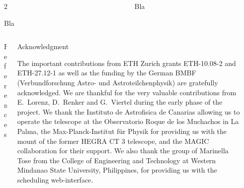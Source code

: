 \documentclass[t]{beamer}
\newlength{\thirdtextwidth}
\begin{document}
\begin{columns}[t, onlytextwidth]
  \begin{column}{2\thirdtextwidth}
    \begin{block}[equal height group=4]{Bla}
      \blindtext
      \blindtext
    \end{block}
  \end{column}
  \begin{column}{\thirdtextwidth}
    \begin{block}[equal height group=4]{Bla}
      \blindtext
    \end{block}
  \end{column}
\end{columns}



\vfill
\begin{columns}[t, onlytextwidth]%
  \begin{column}{0.4\textwidth}%
    \begin{block}[equal height group=bottom]{\normalsize References}
      \footnotesize%
      \printbibliography%
    \end{block}
  \end{column}%
  \begin{column}{0.45\textwidth}%
    \begin{block}[equal height group=bottom]{\normalsize Acknowledgment}
      \begin{multicols}{2}%
        \footnotesize
        The  important  contributions  from  ETH Zurich  grants  ETH-10.08-2  and  ETH-27.12-1  as  well  as  the funding by the German BMBF (Verbundforschung Astro- und Astroteilchenphysik) are gratefully acknowledged.
        We are thankful for the very valuable contributions from E.~Lorenz, D.~Renker and G.~Viertel during the early phase of the project.
        We thank the Instituto de Astrofisica de Canarias allowing us to operate the telescope at the Observatorio Roque de los Muchachos in La Palma, the Max-Planck-Institut für Physik for providing us with the mount of the former HEGRA CT 3 telescope, and the MAGIC collaboration for their support.
        We also thank the group of Marinella Tose from the College of Engineering and Technology at Western Mindanao State University, Philippines, for providing us with the scheduling web-interface.
      \end{multicols}%
    \end{block}
  \end{column}%
  \begin{column}{0.15\textwidth}%

\end{column}
\end{columns}
\end{document}
